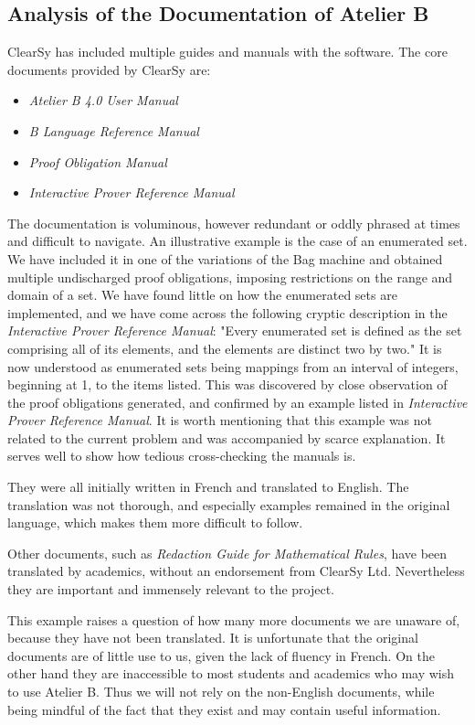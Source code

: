 \documentclass[11pt,journal]{IEEEtran}
\begin{document}
	\subsection{Analysis of the Documentation of Atelier B}
	ClearSy has included multiple guides and manuals with the software. The core documents provided by ClearSy are: 
	\begin{itemize}
		\item \emph{Atelier B 4.0 User Manual}\cite{user manual}
		\item \emph{B Language Reference Manual}\cite{b reference}
		\item \emph{Proof Obligation Manual}\cite{PO reference}
		\item \emph{Interactive Prover Reference Manual}\cite{Prover guide}
	\end{itemize}
	The documentation is voluminous, however redundant or oddly phrased at times and difficult to navigate. An illustrative example is the case of an enumerated set. We have included it in one of the variations of the Bag machine and obtained multiple undischarged proof obligations, imposing restrictions on the range and domain of a set. We have found little on how the enumerated sets are implemented, and we have come across the following cryptic description in the \emph{Interactive Prover Reference Manual}: "Every enumerated set is defined as the set comprising all of its elements, and the elements are distinct two by two." It is now understood as enumerated sets being mappings from an interval of integers, beginning at 1, to the items listed. This was discovered by close observation of the proof obligations generated, and confirmed by an example listed in \emph{Interactive Prover Reference Manual}. It is worth mentioning that this example was not related to the current problem and was accompanied by scarce explanation. It serves well to show how tedious cross-checking the manuals is.

	They were all initially written in French and translated to English. The translation was not thorough, and especially examples remained in the original language, which makes them more difficult to follow.
	
	Other documents, such as \emph{Redaction Guide for Mathematical Rules}\cite{Redacting rules}, have been translated by academics, without an endorsement from ClearSy Ltd. Nevertheless they are important and immensely relevant to the project.
	
	This example raises a question of how many more documents we are unaware of, because they have not been translated. It is unfortunate that the original documents are of little use to us, given the lack of fluency in French. On the other hand they are inaccessible to most students and academics who may wish to use Atelier B. Thus we will not rely on the non-English documents, while being mindful of the fact that they exist and may contain useful information.
\end{document}
